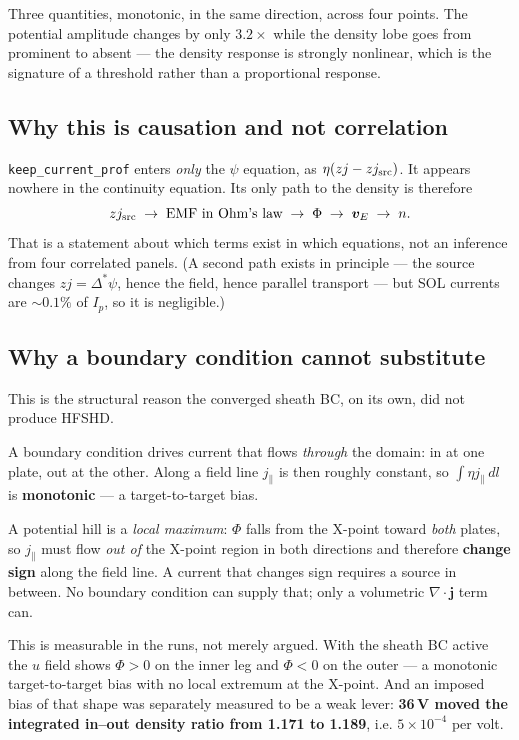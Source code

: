 \documentclass[11pt,a4paper]{article}
\newcommand{\code}[1]{\texttt{\small #1}}
\newcommand{\jpar}{j_\parallel}
\newcommand{\vE}{\bm v_E}
\begin{document}
Three quantities, monotonic, in the same direction, across four points. The potential
amplitude changes by only $3.2\times$ while the density lobe goes from prominent to absent
--- the density response is strongly nonlinear, which is the signature of a threshold rather
than a proportional response.

\subsection{Why this is causation and not correlation}

\code{keep\_current\_prof} enters \emph{only} the $\psi$ equation, as $\eta(zj - zj_{\rm src})$.
It appears nowhere in the continuity equation. Its only path to the density is therefore
\begin{equation}
  zj_{\rm src}\;\rightarrow\;\text{EMF in Ohm's law}\;\rightarrow\;\Phi\;\rightarrow\;\vE\;\rightarrow\;n .
\end{equation}
That is a statement about which terms exist in which equations, not an inference from four
correlated panels. (A second path exists in principle --- the source changes $zj=\Delta^*\psi$,
hence the field, hence parallel transport --- but SOL currents are $\sim0.1\%$ of $I_p$, so it
is negligible.)

\subsection{Why a boundary condition cannot substitute}

This is the structural reason the converged sheath BC, on its own, did not produce HFSHD.

\begin{keybox}
A boundary condition drives current that flows \emph{through} the domain: in at one plate,
out at the other. Along a field line $\jpar$ is then roughly constant, so
$\int\!\eta\jpar\,dl$ is \textbf{monotonic} --- a target-to-target bias.

A potential hill is a \emph{local maximum}: $\Phi$ falls from the X-point toward
\emph{both} plates, so $\jpar$ must flow \emph{out of} the X-point region in both directions
and therefore \textbf{change sign} along the field line. A current that changes sign requires
a source in between. No boundary condition can supply that; only a volumetric
$\nabla\!\cdot\!\bm j$ term can.
\end{keybox}

\noindent This is measurable in the runs, not merely argued. With the sheath BC active the
$u$ field shows $\Phi>0$ on the inner leg and $\Phi<0$ on the outer --- a monotonic
target-to-target bias with no local extremum at the X-point. And an imposed bias of that shape
was separately measured to be a weak lever: \textbf{36\,V moved the integrated in--out density
ratio from 1.171 to 1.189}, i.e. $5\times10^{-4}$ per volt.
\end{document}
